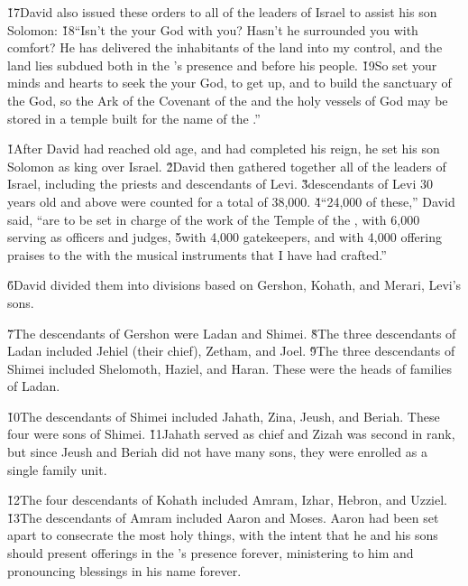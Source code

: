 \v{17}David also issued these orders to all of the leaders of Israel to assist his son Solomon: \v{18}``Isn't the  your God with you? Hasn't he surrounded you with comfort? He has delivered the inhabitants of the land into my control, and the land lies subdued both in the 's presence and before his people. \v{19}So set your minds and hearts to seek the  your God, to get up, and to build the sanctuary of the  God, so the Ark of the Covenant of the  and the holy vessels of God may be stored in a temple built for the name of the .''

\v{1}After David had reached old age, and had completed his reign, he set his son Solomon as king over Israel. \v{2}David then gathered together all of the leaders of Israel, including the priests and descendants of Levi. \v{3}descendants of Levi 30 years old and above were counted for a total of 38,000. \v{4}``24,000 of these,'' David said, ``are to be set in charge of the work of the Temple of the , with 6,000 serving as officers and judges, \v{5}with 4,000 gatekeepers, and with 4,000 offering praises to the  with the musical instruments that I have had crafted.''

\v{6}David divided them into divisions based on Gershon, Kohath, and Merari, Levi's sons.

\v{7}The descendants of Gershon were Ladan and Shimei. \v{8}The three descendants of Ladan included Jehiel (their chief), Zetham, and Joel. \v{9}The three descendants of Shimei included Shelomoth, Haziel, and Haran. These were the heads of families of Ladan.

\v{10}The descendants of Shimei included Jahath, Zina, Jeush, and Beriah. These four were sons of Shimei. \v{11}Jahath served as chief and Zizah was second in rank, but since Jeush and Beriah did not have many sons, they were enrolled as a single family unit.

\v{12}The four descendants of Kohath included Amram, Izhar, Hebron, and Uzziel. \v{13}The descendants of Amram included Aaron and Moses. Aaron had been set apart to consecrate the most holy things, with the intent that he and his sons should present offerings in the 's presence forever, ministering to him and pronouncing blessings in his name forever.


